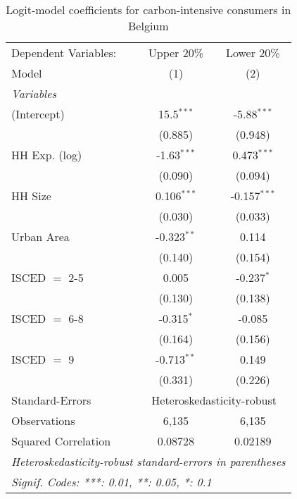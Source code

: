 
\begin{table}[htbp!]
   \centering
   \small
   \begin{adjustbox}{width = 1\textwidth, max height = 0.95\textheight, center}
      \begin{threeparttable}[b]
         \caption{\label{tab:Logit_1_BEL} Logit-model coefficients for carbon-intensive consumers in Belgium}
         \begin{tabular}{lcc}
            \tabularnewline \midrule \midrule
            Dependent Variables: & Upper 20\%    & Lower 20\%\\   
            Model                & (1)           & (2)\\  
            \midrule
            \emph{Variables}\\
            (Intercept)          & 15.5$^{***}$  & -5.88$^{***}$\\   
                                 & (0.885)       & (0.948)\\   
            HH Exp. (log)        & -1.63$^{***}$ & 0.473$^{***}$\\   
                                 & (0.090)       & (0.094)\\   
            HH Size              & 0.106$^{***}$ & -0.157$^{***}$\\   
                                 & (0.030)       & (0.033)\\   
            Urban Area           & -0.323$^{**}$ & 0.114\\   
                                 & (0.140)       & (0.154)\\   
            ISCED $=$ 2-5        & 0.005         & -0.237$^{*}$\\   
                                 & (0.130)       & (0.138)\\   
            ISCED $=$ 6-8        & -0.315$^{*}$  & -0.085\\   
                                 & (0.164)       & (0.156)\\   
            ISCED $=$ 9          & -0.713$^{**}$ & 0.149\\   
                                 & (0.331)       & (0.226)\\   
            \midrule 
            Standard-Errors & \multicolumn{2}{c}{Heteroskedasticity-robust} \\ 
            Observations         & 6,135         & 6,135\\  
            Squared Correlation  & 0.08728       & 0.02189\\  
            \midrule \midrule
            \multicolumn{3}{l}{\emph{Heteroskedasticity-robust standard-errors in parentheses}}\\
            \multicolumn{3}{l}{\emph{Signif. Codes: ***: 0.01, **: 0.05, *: 0.1}}\\
         \end{tabular}
         

\end{threeparttable}
\end{adjustbox}
\end{table}
